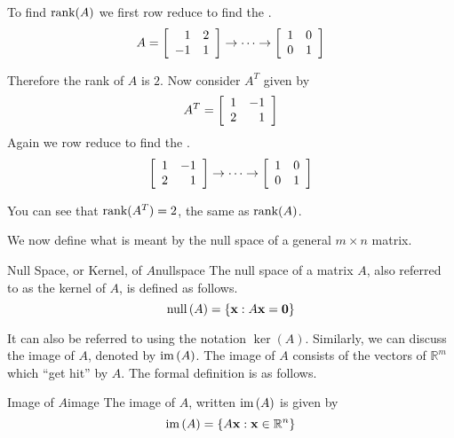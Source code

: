 \begin{solution}
To find $\mbox{rank}(A)$ we first row reduce to find the {\rref}.
\[
A = 
\left[
\begin{array}{rr}
1 & 2 \\
-1 & 1 
\end{array} \right]
\rightarrow \cdots \rightarrow
\left[ \begin{array}{rr}
1 & 0 \\
0 & 1 
\end{array}\right]
\]

Therefore the rank of $A$ is $2$. Now consider $A^T$ given by 
\[
A^T = \left[ \begin{array}{rr}
1 & -1 \\
2 & 1 
\end{array} \right]
\]
Again we row reduce to find the {\rref}.
\[
\left[ \begin{array}{rr}
1 & -1 \\
2 & 1 
\end{array} \right]
\rightarrow \cdots \rightarrow
\left[ \begin{array}{rr}
1 & 0 \\
0 & 1 
\end{array} \right]
\]

You can see that $\mbox{rank}(A^T) = 2$, the same as $\mbox{rank}(A)$. 
\end{solution}

We now define what is meant by the null space of a general $m\times n$ matrix.

\begin{definition}{Null Space, or Kernel, of $A$}{nullspace}
The null space of a matrix $A$, also referred to as the kernel of $A$, 
is defined as follows.  
 
\begin{equation*}
\mbox{null} \left( A\right) =\left\{ {\bf x} :A {\bf x} ={\bf 0}\right\}
\end{equation*}
\end{definition}

It can also be referred to using the notation $\ker \left(
A\right) $. 
Similarly, we can discuss the image of $A$, denoted by
$\mbox{im}\left( A\right)$. The image of $A$ consists of the vectors
of $\mathbb{R}^{m}$ which ``get hit'' by $A$.  The formal definition
is as follows.

\begin{definition}{Image of $A$}{image}
The image of $A$, written $\mbox{im}\left( A\right)$ is given by
\[
\mbox{im}\left( A \right) = \left\{ A{\bf x} : {\bf x} \in \mathbb{R}^n \right\}
\]
\end{definition}

